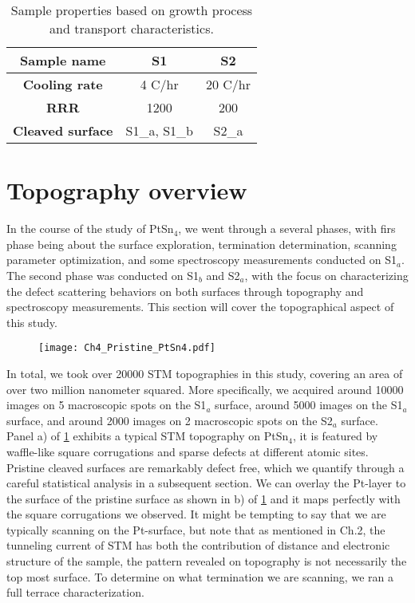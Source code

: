 \begin{table}[h!]
	\centering
	\begin{tabular}{|c|c|c|}
		\hline
		\textbf{Sample name} & \textbf{S1} & \textbf{S2} \\ \hline
		\textbf{Cooling rate} & 4 \degree C/hr & 20 \degree C/hr \\ \hline
		\textbf{\ac{RRR}} & 1200 & 200 \\ \hline
		\textbf{Cleaved surface} & S1\_a, S1\_b & S2\_a \\ \hline
	\end{tabular}
	\caption{Sample properties based on growth process and transport characteristics.}
	\label{table:sample}
\end{table}

\section{Topography overview}
\par In the course of the study of PtSn$_4$, we went through a several phases, with firs phase being about the surface exploration, termination determination, scanning parameter optimization, and some spectroscopy measurements conducted on S1$_a$. The second phase was conducted on S1$_b$ and S2$_a$, with the focus on characterizing the defect scattering behaviors on both surfaces through topography and spectroscopy measurements. This section will cover the topographical aspect of this study. 

\begin{figure}
	\centering
	\texttt{[image: Ch4\_Pristine\_PtSn4.pdf]}
	\caption{ }
	\label{fig:ch4_pristinetopo}
\end{figure}

\par In total, we took over 20000 STM topographies in this study, covering an area of over two million nanometer squared. More specifically, we acquired around 10000 images on 5 macroscopic spots on the S1$_a$ surface, around 5000 images on the S1$_a$ surface, and around 2000 images on 2 macroscopic spots on the S2$_a$ surface. 
Panel a) of \ref{fig:ch4_pristinetopo} exhibits a typical STM topography on PtSn$_4$, it is featured by waffle-like square corrugations and sparse defects at different atomic sites. Pristine cleaved surfaces are remarkably defect free, which we quantify through a careful statistical analysis in a subsequent section. We can overlay the Pt-layer to the surface of the pristine surface as shown in b) of \ref{fig:ch4_pristinetopo} and it maps perfectly with the square corrugations we observed. It might be tempting to say that we are typically scanning on the Pt-surface, but note that as mentioned in Ch.2, the tunneling current of STM has both the contribution of distance and electronic structure of the sample, the pattern revealed on topography is not necessarily the top most surface. To determine on what termination we are scanning, we ran a full terrace characterization.

